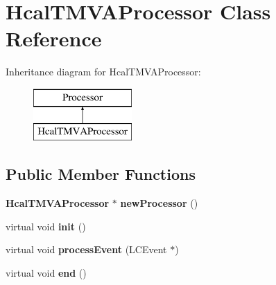 \section{Hcal\-T\-M\-V\-A\-Processor Class Reference}
\label{classHcalTMVAProcessor}
Inheritance diagram for Hcal\-T\-M\-V\-A\-Processor\-:\begin{figure}[H]
\begin{center}
\leavevmode
\includegraphics[height=2.000000cm]{classHcalTMVAProcessor}
\end{center}
\end{figure}
\subsection*{Public Member Functions}
\begin{DoxyCompactItemize}
\item 
{\bf Hcal\-T\-M\-V\-A\-Processor} $\ast$ {\bfseries new\-Processor} ()\label{classHcalTMVAProcessor_a349bd1bb9e3a76bcb1eb140f36263859}

\item 
virtual void {\bfseries init} ()\label{classHcalTMVAProcessor_a3a5c09ecf812c886e905ebdc1446ce58}

\item 
virtual void {\bfseries process\-Event} (L\-C\-Event $\ast$)\label{classHcalTMVAProcessor_a4676ff5e437b9545fbecc26c685cfdc9}

\item 
virtual void {\bfseries end} ()\label{classHcalTMVAProcessor_a40f44f94285655cdaf2c42b84eebeaf1}

\end{DoxyCompactItemize}
